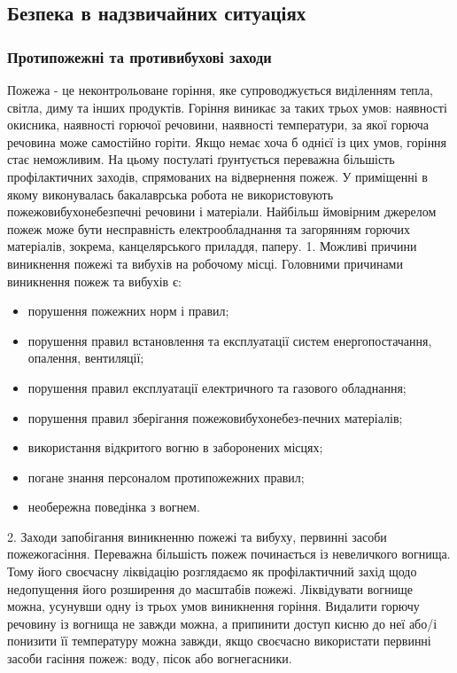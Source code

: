 \documentclass[12pt,a4paper]{article}
\begin{document}
\subsection{Безпека в надзвичайних ситуаціях}
\subsubsection{Протипожежні та противибухові заходи}
Пожежа - це неконтрольоване горіння, яке супроводжується виділенням тепла, світла, диму та інших продуктів. Горіння виникає за таких трьох умов: наявності окисника, наявності горючої речовини, наявності температури, за якої горюча речовина може самостійно горіти. Якщо немає хоча б однієї із цих умов, горіння стає неможливим. На цьому постулаті ґрунтується переважна більшість профілактичних заходів, спрямованих на відвернення пожеж.
У приміщенні в якому виконувалась бакалаврська робота не використовують пожежовибухонебезпечні речовини і матеріали. Найбільш ймовірним джерелом пожеж може бути несправність електрообладнання та загорянням горючих матеріалів, зокрема, канцелярського приладдя, паперу.
1.	Можливі причини виникнення пожежі та вибухів на робочому місці.
Головними причинами виникнення пожеж та вибухів є:
\begin{itemize}
\item	порушення пожежних норм і правил;
\item	порушення правил встановлення та експлуатації систем енергопостачання, опалення, вентиляції;
\item	порушення правил експлуатації електричного та газового обладнання;
\item	порушення правил зберігання пожежовибухонебез-печних матеріалів;
\item	використання відкритого вогню в заборонених місцях;
\item	погане знання персоналом протипожежних правил;
\item	необережна поведінка з вогнем.
\end{itemize}
2.	Заходи запобігання виникненню пожежі та вибуху, первинні засоби пожежогасіння.
Переважна більшість пожеж починається із невеличкого вогнища. Тому його своєчасну ліквідацію розглядаємо як профілактичний захід щодо недопущення його розширення до масштабів пожежі. Ліквідувати вогнище можна, усунувши одну із трьох умов виникнення горіння. Видалити горючу речовину із вогнища не завжди можна, а припинити доступ кисню до неї або/і понизити її температуру можна завжди, якщо своєчасно використати первинні засоби гасіння пожеж: воду, пісок або вогнегасники.
\end{document}
